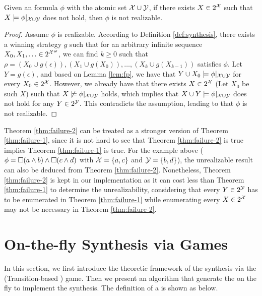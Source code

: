 \begin{theorem}\label{thm:failure-2}
	Given an \ltlf formula $\phi$ with the atomic set $\mathcal{X}\cup \mathcal{Y}$, if there exists $X\in 2^{\mathcal{X}}$ such that $X\models \phi|_{\mathcal{X}\cup\mathcal{Y}}$ does not hold, then $\phi$ is not realizable. 
\end{theorem}
\begin{proof}
Assume $\phi$ is realizable. According to Definition \ref{def:synthesis}, there exists a winning strategy $g$ such that for an arbitrary infinite sequence $X_0,X_1,\ldots\in {2^{\mathcal{X}}}^{\omega}$, we can find $k\geq 0$ such that $\rho=(X_0\cup g(\epsilon)),(X_1\cup g(X_0)), \ldots, (X_k\cup g(X_{k-1}))$ satisfies $\phi$. Let $Y = g(\epsilon)$, and based on Lemma \ref{lem:fp}, we have that $Y\cup X_0\models \phi|_{\mathcal{X}\cup\mathcal{Y}}$ for every $X_0\in 2^{\mathcal{X}}$. However, we already have that there exists $X\in 2^{\mathcal{X}}$ (Let $X_0$ be such $X$) such that $X\not\models \phi|_{\mathcal{X}\cup\mathcal{Y}}$ holds, which implies that $X\cup Y\models \phi|_{\mathcal{X}\cup\mathcal{Y}}$ does not hold for any $Y\in 2^{\mathcal{Y}}$. This contradicts the assumption, leading to that $\phi$ is not realizable.
\end{proof}

Theorem \ref{thm:failure-2} can be treated as a stronger version of Theorem \ref{thm:failure-1}, since it is not hard to see that Theorem \ref{thm:failure-2} is true implies Theorem \ref{thm:failure-1} is true. For the example above ($\phi= \Box (a\wedge b)\wedge \Box (c\wedge d)$ with $\mathcal{X}=\{a,c\}$ and $\mathcal{Y}=\{b,d\}$), the unrealizable result can also be deduced from Theorem \ref{thm:failure-2}. Nonetheless, Theorem \ref{thm:failure-2} is kept in our implementation as it can cost less than Theorem \ref{thm:failure-1} to determine the unrealizability, considering that every $Y\in 2^{\mathcal{Y}}$ has to be enumerated in Theorem \ref{thm:failure-1} while enumerating every $X\in 2^{\mathcal{X}}$ may not be necessary in Theorem \ref{thm:failure-2}.


\section{On-the-fly Synthesis via \tdfa Games}
In this section, we first introduce the theoretic framework of the \ltlf synthesis via the \tdfa (Transition-based \dfa) game. Then we present an algorithm that generate the \tdfa on the fly to implement the synthesis. The definition of a \tdfa is shown as below. 
 
